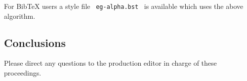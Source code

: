 For BibTeX users a style file \ \texttt{eg-alpha.bst} \ is available which
uses the above algorithm.




\subsection{Conclusions}

Please direct any questions to the production editor in charge of
these proceedings.


%






